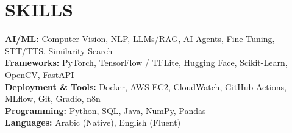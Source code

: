 \documentclass[a4paper,10pt]{article}
\begin{document}

\section{SKILLS}

\textbf{AI/ML:}
Computer Vision, NLP, LLMs/RAG, AI Agents,
Fine-Tuning, STT/TTS, Similarity Search\\[1pt]

\textbf{Frameworks:}
PyTorch, TensorFlow / TFLite, Hugging Face,
Scikit-Learn, OpenCV, FastAPI\\[1pt]

\textbf{Deployment \& Tools:}
Docker, AWS EC2, CloudWatch, GitHub Actions, MLflow,
Git, Gradio, n8n\\[1pt]

\textbf{Programming:}
Python, SQL, Java, NumPy, Pandas\\[1pt]

\textbf{Languages:}
Arabic (Native), English (Fluent)
\end{document}
